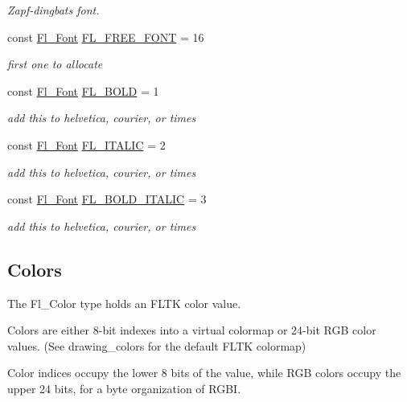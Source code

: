 \begin{DoxyCompactItemize}
\begin{DoxyCompactList}\small\item\em Zapf-\/dingbats font. \end{DoxyCompactList}\item 
const \hyperlink{_enumerations_8_h_a2ac46d9f082834b969fffe490a03a709}{Fl\+\_\+\+Font} \hyperlink{_enumerations_8_h_abdd37d3dbabf724c9bb0438916a6db2f}{F\+L\+\_\+\+F\+R\+E\+E\+\_\+\+F\+O\+NT} = 16
\begin{DoxyCompactList}\small\item\em first one to allocate \end{DoxyCompactList}\item 
const \hyperlink{_enumerations_8_h_a2ac46d9f082834b969fffe490a03a709}{Fl\+\_\+\+Font} \hyperlink{_enumerations_8_h_a5b4c5d04c411d4c086101f5b955c556a}{F\+L\+\_\+\+B\+O\+LD} = 1
\begin{DoxyCompactList}\small\item\em add this to helvetica, courier, or times \end{DoxyCompactList}\item 
const \hyperlink{_enumerations_8_h_a2ac46d9f082834b969fffe490a03a709}{Fl\+\_\+\+Font} \hyperlink{_enumerations_8_h_abdc8e2cce930b923594df50760299776}{F\+L\+\_\+\+I\+T\+A\+L\+IC} = 2
\begin{DoxyCompactList}\small\item\em add this to helvetica, courier, or times \end{DoxyCompactList}\item 
const \hyperlink{_enumerations_8_h_a2ac46d9f082834b969fffe490a03a709}{Fl\+\_\+\+Font} \hyperlink{_enumerations_8_h_a45f68cc36d155e45c4bea90a486a5e13}{F\+L\+\_\+\+B\+O\+L\+D\+\_\+\+I\+T\+A\+L\+IC} = 3
\begin{DoxyCompactList}\small\item\em add this to helvetica, courier, or times \end{DoxyCompactList}\end{DoxyCompactItemize}
\subsection*{Colors}
\label{_amgrp5d50889672f6f860d14f502de3de1957}%
 The Fl\+\_\+\+Color type holds an F\+L\+TK color value.

Colors are either 8-\/bit indexes into a virtual colormap or 24-\/bit R\+GB color values. (See drawing\+\_\+colors for the default F\+L\+TK colormap)

Color indices occupy the lower 8 bits of the value, while R\+GB colors occupy the upper 24 bits, for a byte organization of R\+G\+BI.


